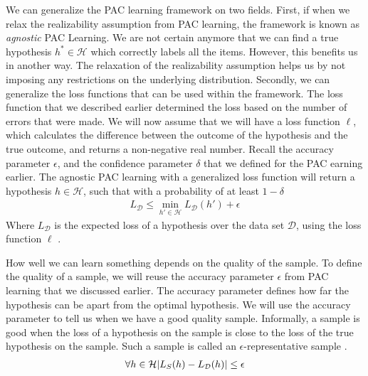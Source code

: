 \documentclass[../main.tex]{subfiles}
\begin{document}
We can generalize the PAC learning framework on two fields.
First, if when we relax the realizability assumption from PAC learning, the framework is known as \emph{agnostic} PAC Learning.
We are not certain anymore that we can find a true hypothesis $h^* \in \mathcal{H}$ which correctly labels all the items.
However, this benefits us in another way.
The relaxation of the realizability assumption helps us by not imposing any restrictions on the underlying distribution.
Secondly, we can generalize the loss functions that can be used within the framework.
The loss function that we described earlier determined the loss based on the number of errors that were made.
We will now assume that we will have a loss function $\ell$,
which calculates the difference between the outcome of the hypothesis and the true outcome,
and returns a non-negative real number.
Recall the accuracy parameter $\epsilon$, and the confidence parameter $\delta$ that we defined for the PAC earning earlier.
The agnostic PAC learning with a generalized loss function will return a hypothesis $h \in \mathcal{H}$,
such that with a probability of at least $1 - \delta$
\begin{align}
    \label{eq:pac_loss}
    L_{\mathcal{D}} \le \min_{h' \in \mathcal{H}} L_{\mathcal{D}}(h') + \epsilon
\end{align}
Where $L_{\mathcal{D}}$ is the expected loss of a hypothesis over the data set $\mathcal{D}$, using the loss function $\ell$
\cite[Chapter~3]{Shalev2014understanding}.


How well we can learn something depends on the quality of the sample.
To define the quality of a sample, we will reuse the accuracy parameter $\epsilon$ from PAC learning that we discussed earlier.
The accuracy parameter defines how far the hypothesis can be apart from the optimal hypothesis.
We will use the accuracy parameter to tell us when we have a good quality sample.
Informally, a sample is good when the loss of a hypothesis on the sample is close to the loss of the true hypothesis on the sample.
Such a sample is called an $\epsilon$-representative sample \cite[Chapter~4]{Shalev2014understanding}.
\begin{align}
    \label{eq:rep_sample}
    \forall h \in \mathcal{H} \lvert L_{S}(h) - L_{\mathcal{D}}(h)\rvert \le \epsilon
\end{align}
\end{document}
